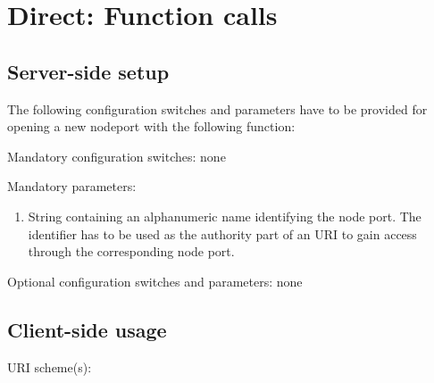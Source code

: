 \section{Direct: Function calls}
\label{sect:nodeport_direct}


\subsection{Server-side setup}

The following configuration switches and parameters have to be provided for opening a new nodeport with the following function:


Mandatory configuration switches: none

Mandatory parameters:
\begin{enumerate}
  \item
String containing an alphanumeric name identifying the node port.
The identifier has to be used as the authority part of an URI to gain access through the corresponding node port.
\end{enumerate}

Optional configuration switches and parameters: none


\subsection{Client-side usage}

URI scheme(s): 
